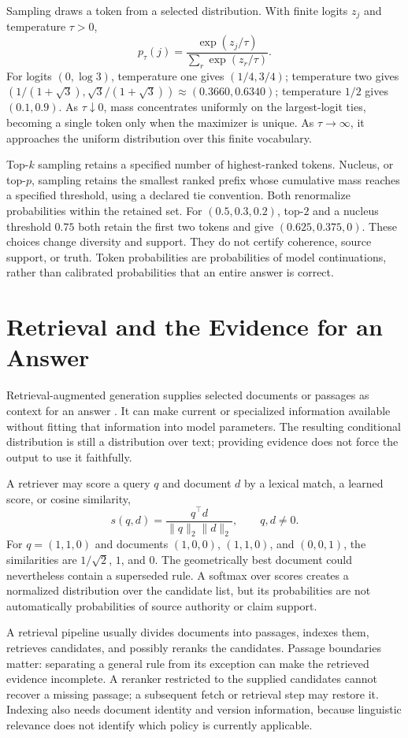 Sampling draws a token from a selected distribution. With finite logits $z_j$ and temperature $\tau>0$,
\[
 p_\tau(j)=\frac{\exp(z_j/\tau)}{\sum_r\exp(z_r/\tau)}.
\]
For logits $(0,\log3)$, temperature one gives $(1/4,3/4)$; temperature two gives $(1/(1+\sqrt3),\sqrt3/(1+\sqrt3))\approx(0.3660,0.6340)$; temperature $1/2$ gives $(0.1,0.9)$. As $\tau\downarrow0$, mass concentrates uniformly on the largest-logit ties, becoming a single token only when the maximizer is unique. As $\tau\to\infty$, it approaches the uniform distribution over this finite vocabulary.

Top-$k$ sampling retains a specified number of highest-ranked tokens. Nucleus, or top-$p$, sampling retains the smallest ranked prefix whose cumulative mass reaches a specified threshold, using a declared tie convention. Both renormalize probabilities within the retained set. For $(0.5,0.3,0.2)$, top-$2$ and a nucleus threshold $0.75$ both retain the first two tokens and give $(0.625,0.375,0)$. These choices change diversity and support. They do not certify coherence, source support, or truth. Token probabilities are probabilities of model continuations, rather than calibrated probabilities that an entire answer is correct.

\section{Retrieval and the Evidence for an Answer}

Retrieval-augmented generation supplies selected documents or passages as context for an answer \citep{lewis2020rag}. It can make current or specialized information available without fitting that information into model parameters. The resulting conditional distribution is still a distribution over text; providing evidence does not force the output to use it faithfully.

A retriever may score a query $q$ and document $d$ by a lexical match, a learned score, or cosine similarity,
\[
 s(q,d)=\frac{q^\top d}{\|q\|_2\|d\|_2},
 \qquad q,d\ne0.
\]
For $q=(1,1,0)$ and documents $(1,0,0)$, $(1,1,0)$, and $(0,0,1)$, the similarities are $1/\sqrt2$, $1$, and $0$. The geometrically best document could nevertheless contain a superseded rule. A softmax over scores creates a normalized distribution over the candidate list, but its probabilities are not automatically probabilities of source authority or claim support.

A retrieval pipeline usually divides documents into passages, indexes them, retrieves candidates, and possibly reranks the candidates. Passage boundaries matter: separating a general rule from its exception can make the retrieved evidence incomplete. A reranker restricted to the supplied candidates cannot recover a missing passage; a subsequent fetch or retrieval step may restore it. Indexing also needs document identity and version information, because linguistic relevance does not identify which policy is currently applicable.

